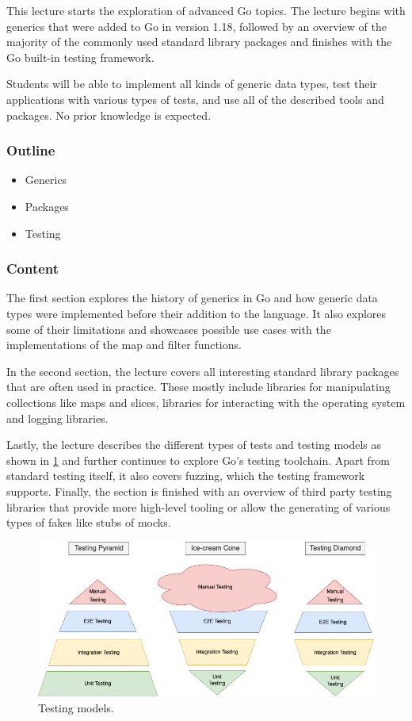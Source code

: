 \documentclass[
  digital,
  color,
  oneside,
  nosansbold,
  nocolorbold,
  nolof,
  nolot,
]{fithesis4}
\begin{document}
This lecture starts the exploration of advanced Go topics. The lecture begins with generics that were added to Go in version 1.18, followed by an overview of the majority of the commonly used standard library packages and finishes with the Go built-in testing framework.

Students will be able to implement all kinds of generic data types, test their applications with various types of tests, and use all of the described tools and packages. No prior knowledge is expected.

\subsubsection{Outline}

\begin{itemize}
    \item Generics
    \item Packages
    \item Testing
\end{itemize}

\subsubsection{Content}

The first section explores the history of generics in Go and how generic data types were implemented before their addition to the language. It also explores some of their limitations and showcases possible use cases with the implementations of the map and filter functions.

In the second section, the lecture covers all interesting standard library packages that are often used in practice. These mostly include libraries for manipulating collections like maps and slices, libraries for interacting with the operating system and logging libraries.

Lastly, the lecture describes the different types of tests and testing models as shown in \cref{fig:testing-models} and further continues to explore Go's testing toolchain. Apart from standard testing itself, it also covers fuzzing, which the testing framework supports. Finally, the section is finished with an overview of third party testing libraries that provide more high-level tooling or allow the generating of various types of fakes like stubs of mocks.

\begin{figure}[H]
    \centering
    \includegraphics[width=12cm]{figures/pyramids.png}
    \caption{Testing models.}
    \label{fig:testing-models}
\end{figure}
\end{document}
